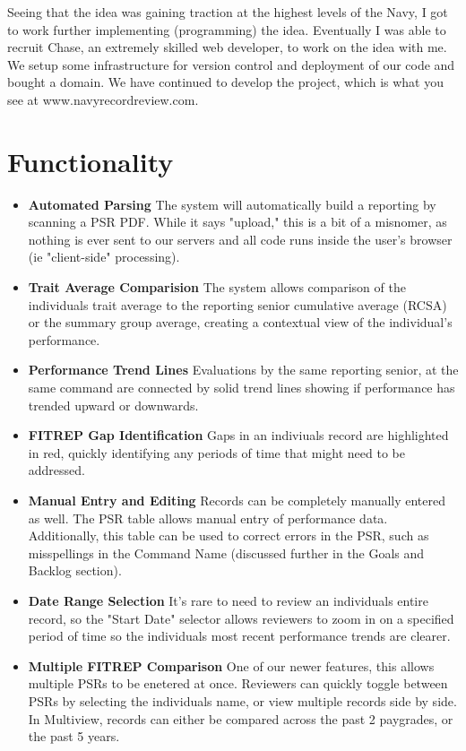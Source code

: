 \documentclass[UTF8]{article}
\begin{document}
Seeing that the idea was gaining traction at the highest levels of the Navy, I got to work further implementing (programming) the idea. Eventually I was able to recruit Chase, an extremely skilled web developer, to work on the idea with me. We setup some infrastructure for version control and deployment of our code and bought a domain. We have continued to develop the project, which is what you see at www.navyrecordreview.com.

\section{Functionality}
\begin{itemize}
  \item \textbf{Automated Parsing} The system will automatically build a reporting by scanning a PSR PDF. While it says "upload," this is a bit of a misnomer, as nothing is ever sent to our servers and all code runs inside the user's browser (ie "client-side" processing).
  \item \textbf{Trait Average Comparision} The system allows comparison of the individuals trait average to the reporting senior cumulative average (RCSA) or the summary group average, creating a contextual view of the individual's performance.
  \item \textbf{Performance Trend Lines} Evaluations by the same reporting senior, at the same command are connected by solid trend lines showing if performance has trended upward or downwards.
  \item \textbf{FITREP Gap Identification} Gaps in an indiviuals record are highlighted in red, quickly identifying any periods of time that might need to be addressed.
  \item \textbf{Manual Entry and Editing} Records can be completely manually entered as well. The PSR table allows manual entry of performance data. Additionally, this table can be used to correct errors in the PSR, such as misspellings in the Command Name (discussed further in the Goals and Backlog section).
  \item \textbf{Date Range Selection} It's rare to need to review an individuals entire record, so the "Start Date" selector allows reviewers to zoom in on a specified period of time so the individuals most recent performance trends are clearer.
  \item \textbf{Multiple FITREP Comparison} One of our newer features, this allows multiple PSRs to be enetered at once. Reviewers can quickly toggle between PSRs by selecting the individuals name, or view multiple records side by side. In Multiview, records can either be compared across the past 2 paygrades, or the past 5 years.
\end{itemize}
\end{document}
